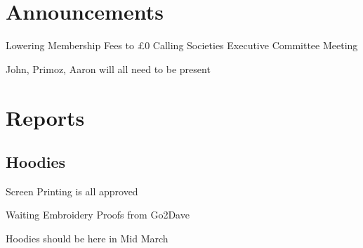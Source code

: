 \documentclass[11pt,hacksoc]{meetingmins}
\begin{document}
\maketitle

\section{Announcements}
\begin{items}
	\item
	Lowering Membership Fees to \pounds0
		\subitem
		Calling Societies Executive Committee Meeting
		
		\subitem
		
		\subitem
		John, Primoz, Aaron will all need to be present

\end{items}

\section{Reports}

\subsection{Hoodies}
\begin{hiddensubitems}
	\item
	
	\item
	Screen Printing is all approved
	
	\item
	Waiting Embroidery Proofs from Go2Dave
	
	\item
	Hoodies should be here in Mid March
	
\end{hiddensubitems}
\end{document}
